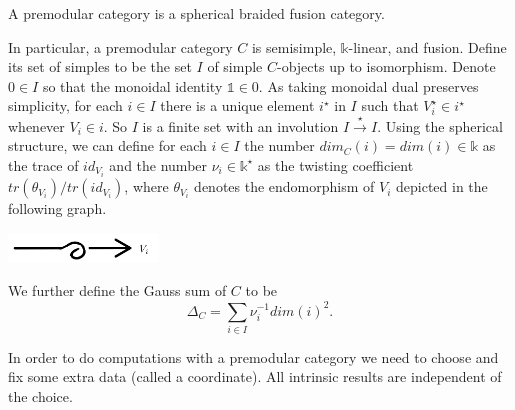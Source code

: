 \begin{definition}\label{def/premodular-category}
  A premodular category is a spherical braided fusion category.
\end{definition}

\noindent In particular, a premodular category $C$ is semisimple,
$\mathbb{k}$-linear, and fusion. Define its set of simples to be
the set $I$ of simple $C$-objects up to isomorphism. Denote
$0 \in I$ so that the monoidal identity $\mathbb{1} \in 0$. As
taking monoidal dual preserves simplicity, for each $i \in I$
there is a unique element $i^{\star}$ in $I$ such that
$V_{i}^{\star} \in i^{\star}$ whenever $V_{i} \in i$. So $I$ is a
finite set with an involution $I \xrightarrow{\star} I$. Using
the spherical structure, we can define for each $i \in I$ the
number $dim_{C}(i) = dim(i) \in \mathbb{k}$ as the trace of
$id_{V_{i}}$ and the number $\nu_{i} \in \mathbb{k}^{\star}$ as
the twisting coefficient $tr(\theta_{V_{i}})/tr(id_{V_{i}})$,
where $\theta_{V_{i}}$ denotes the endomorphism of $V_{i}$
depicted in the following graph.
\begin{center}
  \includegraphics[height=0.8cm]{twist}
\end{center}
We further define the Gauss sum of $C$ to be
$$\Delta_{C} = \sum_{i \in I} \nu_{i}^{-1}dim(i)^{2}.$$

\noindent In order to do computations with a premodular category
we need to choose and fix some extra data (called a coordinate).
All intrinsic results are independent of the choice.

